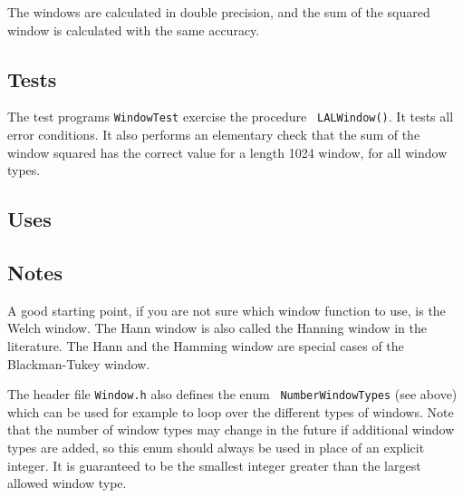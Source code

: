 \documentclass{article}
\begin{document}

The windows are calculated in double precision, and the sum of the squared
window is calculated with the same accuracy.

\subsection{Tests}


The test programs {\tt WindowTest\/} exercise the procedure {\tt
LALWindow()\/}.  It tests all error conditions.  It also performs an
elementary check that the sum of the window squared has the correct
value for a length 1024 window, for all window types.

\subsection{Uses}


\subsection{Notes}

A good starting point, if you are not sure which window function to use,
is the Welch window.  The Hann window is also called the Hanning window
in the literature.  The Hann and the Hamming window are special cases of
the Blackman-Tukey window.

\noindent
The header file {\tt Window.h} also defines the enum {\tt
NumberWindowTypes} (see above) which can be used for example to loop
over the different types of windows.  Note that the number of window
types may change in the future if additional window types are added,
so this enum should always be used in place of an explicit integer. It
is guaranteed to be the smallest integer greater than the largest
allowed window type.
\end{document}
